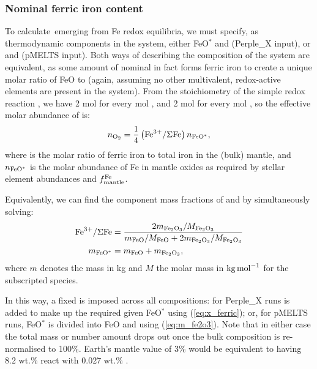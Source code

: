 \subsubsection{Nominal ferric iron content}

To calculate \fo\,emerging from Fe redox equilibria, we must specify, as thermodynamic components in the system, either FeO$^*$ and  (Perple\_X input), or  and  (pMELTS input). Both ways of describing the composition of the system are equivalent, as some amount of nominal  in fact forms ferric iron to create a unique molar ratio of FeO to  (again,  assuming no other multivalent, redox-active elements are present in the system). From the stoichiometry of the simple redox reaction , we have 2 mol  for every mol , and 2 mol  for every mol , so the effective molar abundance of  is: 
\begin{equation}\label{eq:x_ferric}
n_{\ce{O2}} =  \frac{1}{4}\left(\ce{Fe^{3+}}/\Sigma \ce{Fe}\right) n_{\ce{FeO}^*},
\end{equation}
where \xfer\;is the molar ratio of ferric iron to total iron in the (bulk) mantle, and $n_{\ce{FeO}^*}$ is the molar abundance of Fe in mantle oxides as required by stellar element abundances and $f^{\rm Fe}_{\rm mantle}$. 

Equivalently, we can find the component mass fractions of  and  by simultaneously solving:
\begin{equation}\label{eq:m_fe2o3}
\begin{split}
\ce{Fe^{3+}}/\Sigma \ce{Fe} &= \frac{2m_{\ce{Fe2O3}} / M_{\ce{Fe2O3}}}{m_{\ce{FeO}} / M_{\ce{FeO}} + 2m_{\ce{Fe2O3}} / M_{\ce{Fe2O3}}}\\
m_{\ce{FeO}^*} &= m_{\ce{FeO}} + m_{\ce{Fe2O3}},
\end{split}
\end{equation}
where $m$ denotes the mass in kg and $M$ the molar mass in ${\rm kg}\,{\rm mol}^{-1}$ for the subscripted species.

In this way, a fixed \xfer\;is imposed across all compositions: for Perple\_X runs  is added to make up the required \xfer\;given FeO$^*$ using (\ref{eq:x_ferric}); or, for pMELTS runs, FeO$^*$ is divided into FeO and  using (\ref{eq:m_fe2o3}). Note that in either case the total mass or number amount drops out once the bulk composition is re-normalised to 100\%. Earth's mantle \xfer\;value of 3\% would be equivalent to having 8.2 wt.\%  react with 0.027 wt.\% . 

